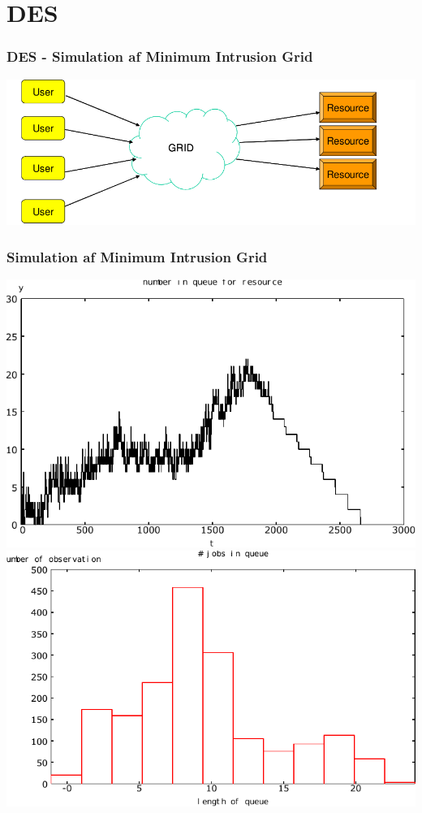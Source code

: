 \documentclass[12pt]{beamer}
\begin{document}
\section{DES}
\begin{frame}
  \frametitle{DES -  Simulation af Minimum Intrusion Grid
}
  \includegraphics[scale=0.3]{mig}  
\end{frame}

\begin{frame}
  \frametitle{Simulation af Minimum Intrusion Grid
}
  \includegraphics[scale=0.45]{tidsmodel-1}
  \includegraphics[scale=0.45]{queue}
\end{frame}
\end{document}
